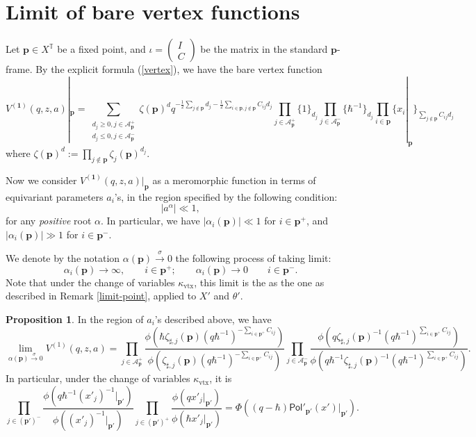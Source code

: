 \documentclass[10pt]{amsart}
\theoremstyle{definition}
\def\TT{\mathbb{T}}
\newcommand{\bp}{\mathbf{p}}
\newcommand{\bone}{\mathbf{1}}
\newcommand{\cA}{\mathcal{A}}
\newcommand{\Pol}{\mathsf{Pol}}
\theoremstyle{definition}
\numberwithin{equation}{section}
\theoremstyle{Theorem}
\newtheorem{Proposition}[Definition]{Proposition}
\begin{document}
\section{Limit of bare vertex functions} \label{limit-point-a}

Let $\bp \in X^\TT$ be a fixed point, and $\iota = \begin{pmatrix}
I \\
C
\end{pmatrix}$ be the matrix in the standard $\bp$-frame. By the explicit formula (\ref{vertex}), we have the bare vertex function
$$
V^{(\bone)} (q, z, a) |_\bp = \sum_{\substack{d_j \geq 0, j\in \cA_\bp^+ \\ d_j \leq 0, j \in \cA_\bp^-} } \zeta (\bp)^d q^{ - \frac{1}{2} \sum_{j\not\in \bp} d_j - \frac{1}{2} \sum_{i\in \bp, j\not\in \bp} C_{ij} d_j } \prod_{j\in \cA_\bp^+} \{1\}_{d_j} \prod_{j\in \cA_\bp^-} \{\hbar^{-1} \}_{d_j} \prod_{i\in \bp} \{ x_i |_\bp \}_{\sum_{j\not\in \bp} C_{ij} d_j}
$$
where $\zeta (\bp)^d := \prod_{j\not\in \bp} \zeta_j (\bp)^{d_j}$.

Now we consider $V^{(\bone)} (q, z, a) |_\bp$ as a meromorphic function in terms of equivariant parameters $a_i$'s, in the region specified by the following condition:
$$
| a^\alpha | \ll 1,
$$
for any \emph{positive} root $\alpha$. In particular, we have $|\alpha_i (\bp)| \ll 1$ for $i\in \bp^+$, and $|\alpha_i (\bp)| \gg 1$ for $i\in \bp^-$.

We denote by the notation $\alpha (\bp) \xrightarrow{\sigma} 0$ the following process of taking limit:
$$
\alpha_i (\bp) \to \infty, \qquad i \in \bp^+; \qquad \alpha_i (\bp) \to 0 \qquad i \in \bp^-.
$$
Note that under the change of variables $\kappa_{\mathrm{vtx}}$, this limit is the as the one as described in Remark \ref{limit-point}, applied to $X'$ and $\theta'$.

\begin{Proposition} \label{limit-V}
In the region of $a_i$'s described above, we have
$$
\lim_{\alpha (\bp) \xrightarrow{\sigma} 0} V^{(1)} (q, z, a) = \prod_{j\in \cA_\bp^+} \frac{\phi \left( \hbar \zeta_{\sharp, j} (\bp) (q\hbar^{-1} )^{-\sum_{i\in \bp^+} C_{ij} }  \right) }{\phi \left( \zeta_{\sharp, j} (\bp) (q\hbar^{-1} )^{-\sum_{i\in \bp^+} C_{ij} }  \right)} \prod_{j\in \cA_\bp^-} \frac{\phi \left( q \zeta_{\sharp, j} (\bp)^{-1} (q\hbar^{-1} )^{\sum_{i\in \bp^+} C_{ij} }  \right) }{\phi \left( q\hbar^{-1}  \zeta_{\sharp, j} (\bp)^{-1} (q\hbar^{-1} )^{\sum_{i\in \bp^+} C_{ij} }  \right)} .
$$
In particular, under the change of variables $\kappa_{\mathrm{vtx}}$, it is
$$
\prod_{j\in (\bp')^-} \frac{\phi \left( q\hbar^{-1} (x'_j)^{-1} |_{\bp'} \right) }{\phi \left( (x'_j)^{-1} |_{\bp'}  \right)} \prod_{j\in (\bp')^+} \frac{\phi \left( q x'_j |_{\bp'} \right) }{\phi \left( \hbar x'_j |_{\bp'} \right)} = \Phi ((q - \hbar) \Pol'_{\bp'} (x') |_{\bp'} ).
$$
\end{Proposition}
\end{document}
